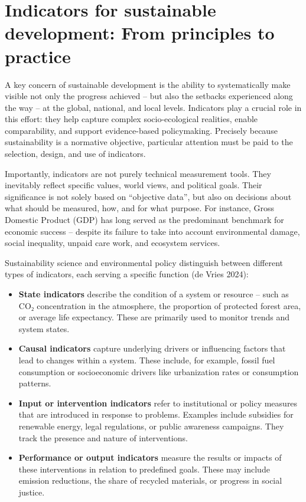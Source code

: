 \documentclass[
  a4paper,
  DIV=11,
  numbers=noendperiod,
  oneside,
  openany]{scrreprt}
\begin{document}
\section{Indicators for sustainable development: From principles to
practice}\label{indicators-for-sustainable-development-from-principles-to-practice}

A key concern of sustainable development is the ability to
systematically make visible not only the progress achieved -- but also
the setbacks experienced along the way -- at the global, national, and
local levels. Indicators play a crucial role in this effort: they help
capture complex socio-ecological realities, enable comparability, and
support evidence-based policymaking. Precisely because sustainability is
a normative objective, particular attention must be paid to the
selection, design, and use of indicators.

Importantly, indicators are not purely technical measurement tools. They
inevitably reflect specific values, world views, and political goals.
Their significance is not solely based on ``objective data'', but also
on decisions about what should be measured, how, and for what purpose.
For instance, Gross Domestic Product (GDP) has long served as the
predominant benchmark for economic success -- despite its failure to
take into account environmental damage, social inequality, unpaid care
work, and ecosystem services.

Sustainability science and environmental policy distinguish between
different types of indicators, each serving a specific function ({de
Vries} 2024):

\begin{itemize}
\item
  \textbf{State indicators} describe the condition of a system or
  resource -- such as CO₂ concentration in the atmosphere, the
  proportion of protected forest area, or average life expectancy. These
  are primarily used to monitor trends and system states.
\item
  \textbf{Causal indicators} capture underlying drivers or influencing
  factors that lead to changes within a system. These include, for
  example, fossil fuel consumption or socioeconomic drivers like
  urbanization rates or consumption patterns.
\item
  \textbf{Input or intervention indicators} refer to institutional or
  policy measures that are introduced in response to problems. Examples
  include subsidies for renewable energy, legal regulations, or public
  awareness campaigns. They track the presence and nature of
  interventions.
\item
  \textbf{Performance or output indicators} measure the results or
  impacts of these interventions in relation to predefined goals. These
  may include emission reductions, the share of recycled materials, or
  progress in social justice.
\end{itemize}
\end{document}
